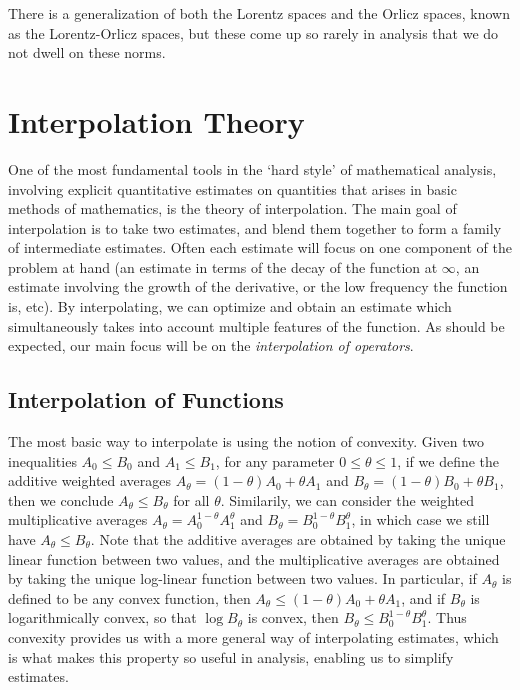 There is a generalization of both the Lorentz spaces and the Orlicz spaces, known as the Lorentz-Orlicz spaces, but these come up so rarely in analysis that we do not dwell on these norms.
















\chapter{Interpolation Theory}

One of the most fundamental tools in the `hard style' of mathematical analysis, involving explicit quantitative estimates on quantities that arises in basic methods of mathematics, is the theory of interpolation. The main goal of interpolation is to take two estimates, and blend them together to form a family of intermediate estimates. Often each estimate will focus on one component of the problem at hand (an estimate in terms of the decay of the function at $\infty$, an estimate involving the growth of the derivative, or the low frequency the function is, etc). By interpolating, we can optimize and obtain an estimate which simultaneously takes into account multiple features of the function. As should be expected, our main focus will be on the \emph{interpolation of operators}.

\section{Interpolation of Functions}

The most basic way to interpolate is using the notion of convexity. Given two inequalities $A_0 \leq B_0$ and $A_1 \leq B_1$, for any parameter $0 \leq \theta \leq 1$, if we define the additive weighted averages $A_\theta = (1 - \theta) A_0 + \theta A_1$ and $B_\theta = (1 - \theta) B_0 + \theta B_1$, then we conclude $A_\theta \leq B_\theta$ for all $\theta$. Similarily, we can consider the weighted multiplicative averages $A_\theta = A_0^{1 - \theta} A_1^\theta$ and $B_\theta = B_0^{1 - \theta}B_1^\theta$, in which case we still have $A_\theta \leq B_\theta$. Note that the additive averages are obtained by taking the unique linear function between two values, and the multiplicative averages are obtained by taking the unique log-linear function between two values. In particular, if $A_\theta$ is defined to be any convex function, then $A_\theta \leq (1 - \theta) A_0 + \theta A_1$, and if $B_\theta$ is logarithmically convex, so that $\log B_\theta$ is convex, then $B_\theta \leq B_0^{1 - \theta} B_1^\theta$. Thus convexity provides us with a more general way of interpolating estimates, which is what makes this property so useful in analysis, enabling us to simplify estimates.


